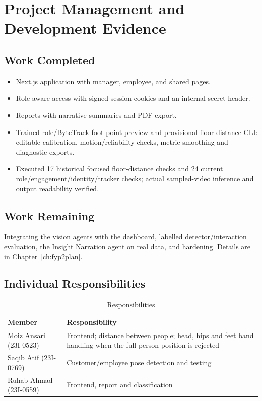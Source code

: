 \chapter{Project Management and Development Evidence}
\label{ch:mgmt}
\section{Work Completed}
\begin{itemize}
\item Next.js application with manager, employee, and shared pages.
\item Role-aware access with signed session cookies and an internal secret header.
\item Reports with narrative summaries and PDF export.
\item Trained-role/ByteTrack foot-point preview and provisional floor-distance CLI: editable calibration, motion/reliability checks, metric smoothing and diagnostic exports.
\item Executed 17 historical focused floor-distance checks and 24 current role/engagement/identity/tracker checks; actual sampled-video inference and output readability verified.
\end{itemize}

\section{Work Remaining}
Integrating the vision agents with the dashboard, labelled detector/interaction evaluation, the Insight Narration agent on real data, and hardening. Details are in Chapter~\ref{ch:fyp2plan}.

\section{Individual Responsibilities}
\begin{table}[H]
\centering
\caption{Responsibilities}
\begin{tabular}{P{0.25\textwidth}P{0.62\textwidth}}
\toprule
Member & Responsibility\\
\midrule
Moiz Ansari (23I-0523) & Frontend; distance between people; head, hips and feet band handling when the full-person position is rejected\\
Saqib Atif (23I-0769) & Customer/employee pose detection and testing\\
Ruhab Ahmad (23I-0559) & Frontend, report and classification\\
\bottomrule
\end{tabular}
\end{table}

